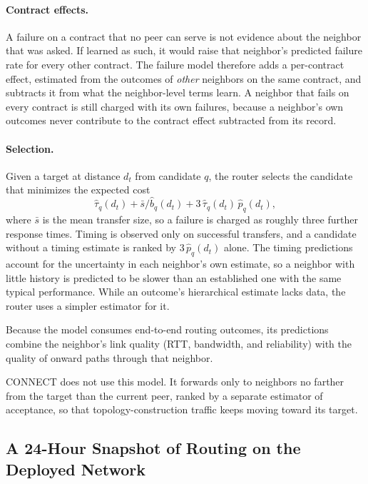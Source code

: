 \paragraph{Contract effects.} A failure on a contract that no peer can serve is not evidence about the neighbor that was asked. If learned as such, it would raise that neighbor's predicted failure rate for every other contract. The failure model therefore adds a per-contract effect, estimated from the outcomes of \emph{other} neighbors on the same contract, and subtracts it from what the neighbor-level terms learn. A neighbor that fails on every contract is still charged with its own failures, because a neighbor's own outcomes never contribute to the contract effect subtracted from its record.

\paragraph{Selection.} Given a target at distance $d_t$ from candidate $q$, the router selects the candidate that minimizes the expected cost
\[
  \widehat{\tau}_q(d_t) + \bar{s}/\widehat{b}_q(d_t) + 3\,\widehat{\tau}_q(d_t)\,\widehat{p}_q(d_t),
\]
where $\bar{s}$ is the mean transfer size, so a failure is charged as roughly three further response times. Timing is observed only on successful transfers, and a candidate without a timing estimate is ranked by $3\,\widehat{p}_q(d_t)$ alone. The timing predictions account for the uncertainty in each neighbor's own estimate, so a neighbor with little history is predicted to be slower than an established one with the same typical performance. While an outcome's hierarchical estimate lacks data, the router uses a simpler estimator for it.

Because the model consumes end-to-end routing outcomes, its predictions combine the neighbor's link quality (RTT, bandwidth, and reliability) with the quality of onward paths through that neighbor.

\textsf{CONNECT} does not use this model. It forwards only to neighbors no farther from the target than the current peer, ranked by a separate estimator of acceptance, so that topology-construction traffic keeps moving toward its target.

\subsection{A 24-Hour Snapshot of Routing on the Deployed Network}
\label{sec:routing-measurement}

